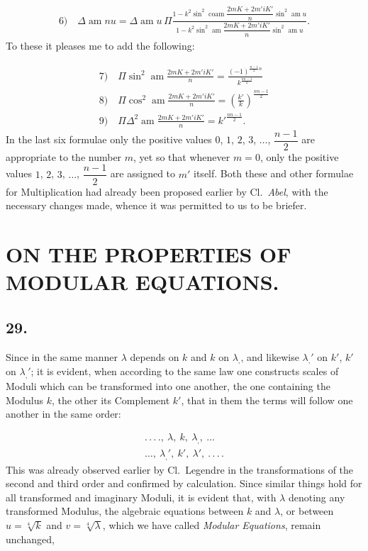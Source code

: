 \documentclass{article}
\begin{document}
\[
\begin{gathered}
\text{6)}\quad\Delta\operatorname{am}nu=\Delta\operatorname{am}u\,\Pi\frac{1-k^{2}\sin^{2}\operatorname{coam}\dfrac{2mK+2m'iK'}{n}\sin^{2}\operatorname{am}u}{1-k^{2}\sin^{2}\operatorname{am}\dfrac{2mK+2m'iK'}{n}\sin^{2}\operatorname{am}u}.
\end{gathered}
\]
To these it pleases me to add the following:

\[
\begin{gathered}
\text{7)}\quad\Pi\sin^{2}\operatorname{am}\frac{2mK+2m'iK'}{n}=\frac{(-1)^{\frac{n-1}{2}n}}{k^{\frac{nn-1}{2}}}\\[1.5ex]
\text{8)}\quad\Pi\cos^{2}\operatorname{am}\frac{2mK+2m'iK'}{n}=\left(\frac{k'}{k}\right)^{\frac{nn-1}{2}}\\[1.5ex]
\text{9)}\quad\Pi\Delta^{2}\operatorname{am}\frac{2mK+2m'iK'}{n}=k'^{\frac{nn-1}{2}}.
\end{gathered}
\]
In the last six formulae only the positive values $0$, $1$, $2$, $3$, $\ldots$, $\dfrac{n-1}{2}$ are appropriate to the number $m$, yet so that whenever $m=0$, only the positive values $1$, $2$, $3$, $\ldots$, $\dfrac{n-1}{2}$ are assigned to $m'$ itself. Both these and other formulae for Multiplication had already been proposed earlier by Cl.\ \emph{Abel}, with the necessary changes made, whence it was permitted to us to be briefer.

\section*{ON THE PROPERTIES OF MODULAR EQUATIONS.}

\subsection*{29.}

Since in the same manner $\lambda$ depends on $k$ and $k$ on $\lambda_{,}$, and likewise $\lambda_{,}'$ on $k'$, $k'$ on $\lambda_{,}'$; it is evident, when according to the same law one constructs scales of Moduli which can be transformed into one another, the one containing the Modulus $k$, the other its Complement $k'$, that in them the terms will follow one another in the same order:

\[
\begin{gathered}
.\,.\,.\,.,\ \lambda,\ k,\ \lambda_{,},\ \ldots\\
\ldots,\ \lambda_{,}',\ k',\ \lambda',\ .\,.\,.\,.
\end{gathered}
\]
This was already observed earlier by Cl.\ Legendre in the transformations of the second and third order and confirmed by calculation. Since similar things hold for all transformed and imaginary Moduli, it is evident that, with $\lambda$ denoting any transformed Modulus, the algebraic equations between $k$ and $\lambda$, or between $u=\sqrt[4]{k}$ and $v=\sqrt[4]{\lambda}$, which we have called \emph{Modular Equations}, remain unchanged,
\end{document}
